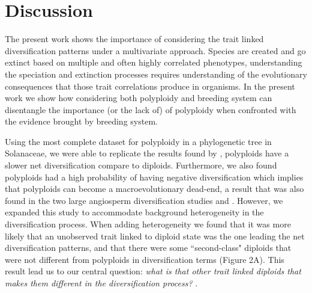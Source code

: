 \section{Discussion}

The present work shows the importance of considering the trait linked diversification patterns under a multivariate approach.
Species are created and go extinct based on multiple and often highly correlated phenotypes, understanding the speciation and extinction processes requires understanding of the evolutionary consequences that those trait correlations produce in organisms.
In the present work we show how considering both polyploidy and breeding system can disentangle the importance (or the lack of) of polyploidy when confronted with the evidence brought by breeding system.

Using the most complete dataset for polyploidy in a phylogenetic tree in Solanaceae, we were able to replicate the results found by \citet{mayrose_2011}, polyploids have a slower net diversification compare to diploids.
Furthermore,  we also found polyploids had a high probability of having negative diversification which implies that polyploids can become a macroevolutionary dead-end, a result that was also found in the two large angiosperm diversification studies  \citet{mayrose_2011} and \citet{mayrose_2015}.
However, we expanded this study to accommodate  background heterogeneity in the diversification process.
When adding heterogeneity we found that it was more likely that an unobserved trait linked to diploid state was the one leading the net diversification patterns, and that there were some ``second-class"  diploids that were not different from  polyploids  in diversification terms (Figure 2A).
This result lead us to our central question: \textit{what is that other trait linked diploids that makes them different in the diversification process? }.

